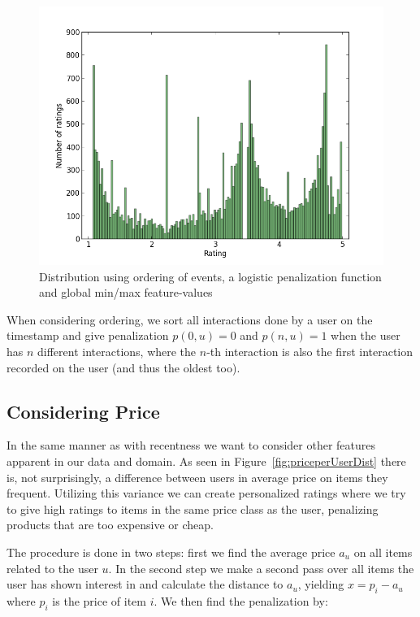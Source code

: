 \begin{figure}[H]
  \centering
  \includegraphics[scale=0.5]{image/dist-sigmoid-fixed-count-3-5}
  \caption[Distribution using ordering of events w/logistic penalization]{Distribution using ordering of events, a logistic penalization
  function and global min/max feature-values}
  \label{fig:dist-count-sigmoid}
\end{figure}

When considering ordering, we sort all interactions done by a user on the
timestamp and give penalization $p(0,u) = 0$ and $p(n,u) = 1$ when the user has
$n$ different interactions, where the $n$-th interaction is also the first
interaction recorded on the user (and thus the oldest too).

\subsection{Considering Price}

In the same manner as with recentness we want to consider other features
apparent in our data and domain. As seen in Figure~\ref{fig:priceperUserDist}
there is, not surprisingly, a difference between users in average price on
items they frequent. Utilizing this variance we can create personalized ratings
where we try to give high ratings to items in the same price class as the user,
penalizing products that are too expensive or cheap.

The procedure is done in two steps: first we find the average price $a_u$ on
all items related to the user $u$. In the second step we make a second pass
over all items the user has shown interest in and calculate the distance to
$a_u$, yielding $x = p_i - a_u$ where $p_i$ is the price of item $i$. We then
find the penalization by:

